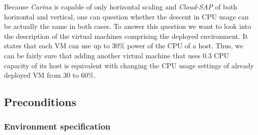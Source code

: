 Because \emph{Carina} is capable of only horizontal scaling and \emph{Cloud-SAP} of both horizontal and vertical, one can question whether the descent in CPU usage can be actually the same in both cases. To answer this question we want to look into the description of the virtual machines comprising the deployed environment. It states that each VM can use up to 30\% power of the CPU of a host. Thus, we can be fairly sure that adding another virtual machine that uses 0.3 CPU capacity of its host is equivalent with changing the CPU usage settings of already deployed VM from 30 to 60\%.
\subsection*{Preconditions}
\subsubsection*{Environment specification}
